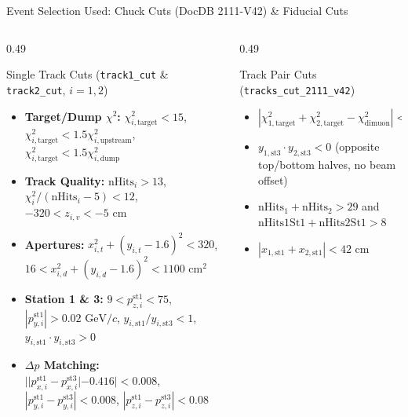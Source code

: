 \documentclass[aspectratio=169, 10pt]{beamer}
\begin{document}
\begin{frame}{Event Selection Used: Chuck Cuts (DocDB 2111-V42) \& Fiducial Cuts}
\begin{columns}[T, onlytextwidth]
\begin{column}{0.49\textwidth}
        \begin{block}{\scriptsize Single Track Cuts (\texttt{track1\_cut} \& \texttt{track2\_cut}, $i=1,2$)}
            \tiny
            \begin{itemize}
                \item \textbf{Target/Dump $\chi^2$:} $\chi^2_{i,\text{target}} < 15$, $\chi^2_{i,\text{target}} < 1.5\chi^2_{i,\text{upstream}}$, $\chi^2_{i,\text{target}} < 1.5\chi^2_{i,\text{dump}}$
                \item \textbf{Track Quality:} $\text{nHits}_i > 13$, $\chi^2_i / (\text{nHits}_i - 5) < 12$, $-320 < z_{i,v} < -5\text{ cm}$
                \item \textbf{Apertures:} $x_{i,t}^2 + (y_{i,t} - 1.6)^2 < 320$, $16 < x_{i,d}^2 + (y_{i,d} - 1.6)^2 < 1100\text{ cm}^2$
                \item \textbf{Station 1 \& 3:} $9 < p_{z,i}^{\text{st1}} < 75$, $|p_{y,i}^{\text{st1}}| > 0.02\text{ GeV}/c$, $y_{i,\text{st1}}/y_{i,\text{st3}} < 1$, $y_{i,\text{st1}} \cdot y_{i,\text{st3}} > 0$
                \item \textbf{$\Delta p$ Matching:} $||p_{x,i}^{\text{st1}} - p_{x,i}^{\text{st3}}| - 0.416| < 0.008$, $|p_{y,i}^{\text{st1}} - p_{y,i}^{\text{st3}}| < 0.008$, $|p_{z,i}^{\text{st1}} - p_{z,i}^{\text{st3}}| < 0.08$
            \end{itemize}
        \end{block}
    \end{column}

    \begin{column}{0.49\textwidth}
        \begin{block}{\scriptsize Track Pair Cuts (\texttt{tracks\_cut\_2111\_v42})}
            \tiny
            \begin{itemize}
                \item $|\chi^2_{1,\text{target}} + \chi^2_{2,\text{target}} - \chi^2_{\text{dimuon}}| < 2.0$
                \item $y_{1,\text{st3}} \cdot y_{2,\text{st3}} < 0$ (opposite top/bottom halves, no beam offset)
                \item $\text{nHits}_1 + \text{nHits}_2 > 29$ and $\text{nHits1St1} + \text{nHits2St1} > 8$
                \item $|x_{1,\text{st1}} + x_{2,\text{st1}}| < 42\text{ cm}$
            \end{itemize}
        \end{block}


\end{column}
\end{columns}
\end{frame}
\end{document}
